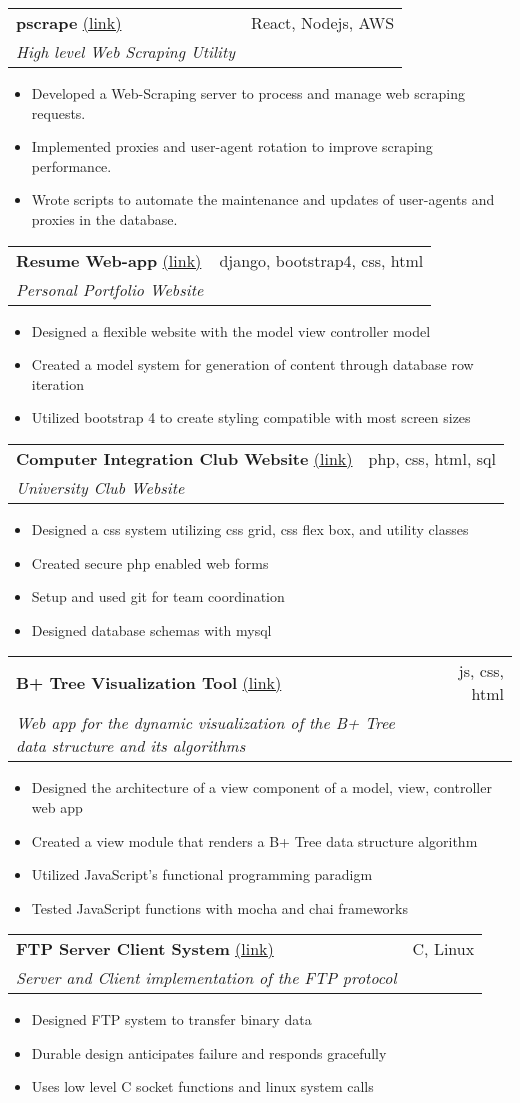 \documentclass[letterpaper,11pt]{article}
\makeatletter
\newcommand{\resumeItem}[2]{
  \item\small{
    \textbf{#1}{ #2 \vspace{-2pt}}
  }
}
\newcommand{\resumeSubheading}[5]{
  \vspace{-1pt}\item
    \begin{tabular*}{0.97\textwidth}[t]{l@{\extracolsep{\fill}}r}
      \textbf{#1} #2 & #3 \\
      \textit{\small#4} & \textit{\small #5} \\
    \end{tabular*}\vspace{-5pt}
}
\newcommand{\resumeSubItem}[2]{\resumeItem{#1}{#2}\vspace{-4pt}}
\newcommand{\resumeItemListStart}{\begin{itemize}[leftmargin=*]}
\newcommand{\resumeItemListEnd}{\end{itemize}\vspace{-5pt}}
\makeatother
\begin{document}
  \resumeSubheading{pscrape}{\href{https://github.com/munikeraragon/p_scrape}{(link)}}{React, Nodejs, AWS}{High level Web Scraping Utility}{}
    \resumeItemListStart
      \resumeSubItem{}{Developed a Web-Scraping server to process and manage web scraping requests.}
      \resumeSubItem{}{Implemented proxies and user-agent rotation to improve scraping performance.}
      \resumeSubItem{}{Wrote scripts to automate the maintenance and updates of user-agents and proxies in the database.}
    \resumeItemListEnd

  \resumeSubheading{Resume Web-app}{\href{http://www.treverhibbs.com/}{(link)}}{django, bootstrap4, css, html}{Personal Portfolio Website}{}
	\resumeItemListStart
		\resumeSubItem{}{Designed a flexible website with the model view controller model}
		\resumeSubItem{}{Created a model system for generation of content through database row iteration}
		\resumeSubItem{}{Utilized bootstrap 4 to create styling compatible with most screen sizes}
	\resumeItemListEnd

  \resumeSubheading{Computer Integration Club Website}{\href{http://www6.encs.vancouver.wsu.edu/}{(link)}}{php, css, html, sql}{University Club Website}{}
	\resumeItemListStart
		\resumeSubItem{}{Designed a css system utilizing css grid, css flex box, and utility classes}
		\resumeSubItem{}{Created secure php enabled web forms}
		\resumeSubItem{}{Setup and used git for team coordination}
	\resumeSubItem{}{Designed database schemas with mysql}
  \resumeItemListEnd
  
  \resumeSubheading{B+ Tree Visualization Tool}{\href{https://github.com/TreverHibbs/BPlusTree}{(link)}}{js, css, html}{Web app for the dynamic visualization of the B+ Tree data structure and its algorithms}{}
	\resumeItemListStart
		\resumeSubItem{}{Designed the architecture of a view component of a model, view, controller web app}
		\resumeSubItem{}{Created a view module that renders a B+ Tree data structure algorithm}
		\resumeSubItem{}{Utilized JavaScript's functional programming paradigm}
	\resumeSubItem{}{Tested JavaScript functions with mocha and chai frameworks}
  \resumeItemListEnd

  \resumeSubheading{FTP Server Client System}{\href{https://github.com/dbutler12/FTP}{(link)}}{C, Linux}{Server and Client implementation of the FTP protocol}{}
    \resumeItemListStart
      \resumeSubItem{}{Designed FTP system to transfer binary data}
      \resumeSubItem{}{Durable design anticipates failure and responds gracefully}
      \resumeSubItem{}{Uses low level C socket functions and linux system calls}
    \resumeItemListEnd
\end{document}
